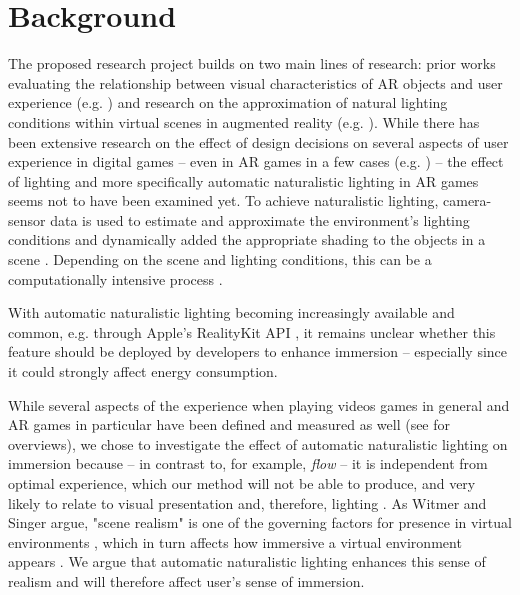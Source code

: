 \documentclass[12pt,twoside,english]{article}
\begin{document}
\section{Background}
\label{sect:background}
The proposed research project builds on two main lines of research: prior works evaluating the relationship between visual characteristics of \gls{AR} objects and user experience (e.g. \cite{gabbard_effects_2006}) and research on the approximation of natural lighting conditions within virtual scenes in augmented reality (e.g. \cite{aittala_inverse_2010}).
While there has been extensive research on the effect of design decisions on several aspects of user experience in digital games \cite{johnson_validation_2018} -- even in \gls{AR} games in a few cases (e.g. \cite{georgiou_development_2017}) -- the effect of lighting and more specifically automatic naturalistic lighting in \gls{AR} games seems not to have been examined yet.
To achieve naturalistic lighting, camera-sensor data is used to estimate and approximate the environment's lighting conditions and dynamically added the appropriate shading to the objects in a scene \cite{apple_arlightestimate_nodate,apple_pointlight_nodate}.
Depending on the scene and lighting conditions, this can be a computationally intensive process \cite{steed_constructing_2016}.

With automatic naturalistic lighting becoming increasingly available and common, e.g. through Apple's RealityKit API \cite{apple_realitykit_nodate}, it remains unclear whether this feature should be deployed by developers to enhance immersion -- especially since it could strongly affect energy consumption.

While several aspects of the experience when playing videos games in general and \gls{AR} games in particular have been defined and measured as well (see \cite{dey_systematic_2018, dunser_survey_2008} for overviews), we chose to investigate the effect of automatic naturalistic lighting on immersion because -- in contrast to, for example, \textit{flow} \cite{csikszentmihalyi_flow_1990} -- it is independent from optimal experience, which our method will not be able to produce, and very likely to relate to visual presentation and, therefore, lighting \cite{jennett_measuring_2008}.
As Witmer and Singer argue, "scene realism" is one of the governing factors for presence in virtual environments \cite{witmer_measuring_1998}, which in turn affects how immersive a virtual environment appears \cite{jennett_measuring_2008}.
We argue that automatic naturalistic lighting enhances this sense of realism and will therefore affect user's sense of immersion.
\end{document}
